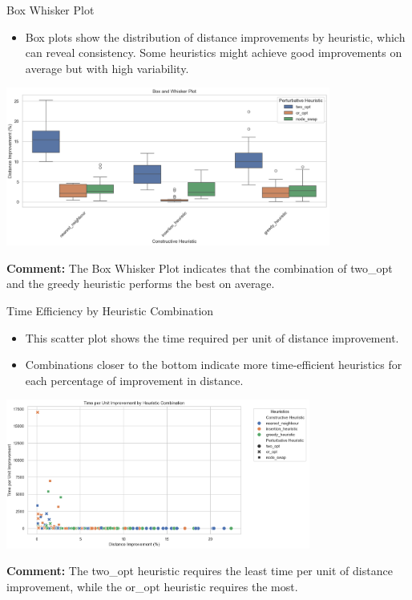 \documentclass[presentation]{beamer}
\begin{document}
\begin{frame}{Box Whisker Plot}
\begin{itemize}
    \item Box plots show the distribution of distance improvements by heuristic, which can reveal consistency. Some heuristics might achieve good improvements on average but with high variability.
\end{itemize}
\begin{center}
\includegraphics[width=0.8\textwidth]{Box_Whisker_Plot.png}\\
\end{center}
\textbf{Comment:} The Box Whisker Plot indicates that the combination of two\_opt and the greedy heuristic performs the best on average.
\end{frame}

\begin{frame}{Time Efficiency by Heuristic Combination}
\begin{itemize}
    \item This scatter plot shows the time required per unit of distance improvement.
    \item Combinations closer to the bottom indicate more time-efficient heuristics for each percentage of improvement in distance.
\end{itemize}
\begin{center}
\includegraphics[width=0.75\textwidth]{time_efficiency_plot.png}\\
\end{center}
\textbf{Comment:} The two\_opt heuristic requires the least time per unit of distance improvement, while the or\_opt heuristic requires the most.
\end{frame}
\end{document}
